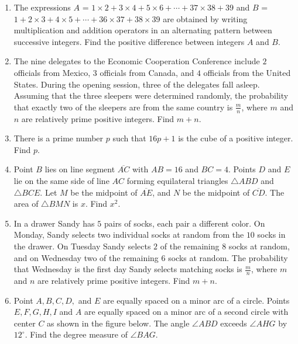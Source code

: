 \documentclass{article}
\begin{document}
\begin{enumerate}[label=\arabic*., itemsep=0.5em]
\item The expressions \(A\) = \( 1 \times 2 + 3 \times 4 + 5 \times 6 + \cdots + 37 \times 38 + 39 \) and \(B\) = \( 1 + 2 \times 3 + 4 \times 5 + \cdots + 36 \times 37 + 38 \times 39 \) are obtained by writing multiplication and addition operators in an alternating pattern between successive integers.  Find the positive difference between integers \(A\) and \(B\).\par \vspace{0.5em}\item The nine delegates to the Economic Cooperation Conference include \(2\) officials from Mexico, \(3\) officials from Canada, and \(4\) officials from the United States. During the opening session, three of the delegates fall asleep. Assuming that the three sleepers were determined randomly, the probability that exactly two of the sleepers are from the same country is \(\frac{m}{n}\), where \(m\) and \(n\) are relatively prime positive integers. Find \(m+n\).\par \vspace{0.5em}\item There is a prime number \(p\) such that \(16p+1\) is the cube of a positive integer.  Find \(p\).\par \vspace{0.5em}\item Point \(B\) lies on line segment \(\overline{AC}\) with \(AB=16\) and \(BC=4\). Points \(D\) and \(E\) lie on the same side of line \(AC\) forming equilateral triangles \(\triangle ABD\) and \(\triangle BCE\). Let \(M\) be the midpoint of \(\overline{AE}\), and \(N\) be the midpoint of \(\overline{CD}\). The area of \(\triangle BMN\) is \(x\). Find \(x^2\).\par \vspace{0.5em}\item In a drawer Sandy has \(5\) pairs of socks, each pair a different color.  On Monday, Sandy selects two individual socks at random from the \(10\) socks in the drawer.  On Tuesday Sandy selects \(2\) of the remaining \(8\) socks at random, and on Wednesday two of the remaining \(6\) socks at random.  The probability that Wednesday is the first day Sandy selects matching socks is \(\frac{m}{n}\), where \(m\) and \(n\) are relatively prime positive integers. Find \(m+n\).\par \vspace{0.5em}\item Point \(A,B,C,D,\) and \(E\) are equally spaced on a minor arc of a circle. Points \(E,F,G,H,I\) and \(A\) are equally spaced on a minor arc of a second circle with center \(C\) as shown in the figure below. The angle \(\angle ABD\) exceeds \(\angle AHG\) by \(12^\circ\). Find the degree measure of \(\angle BAG\).



\end{enumerate}
\end{document}

